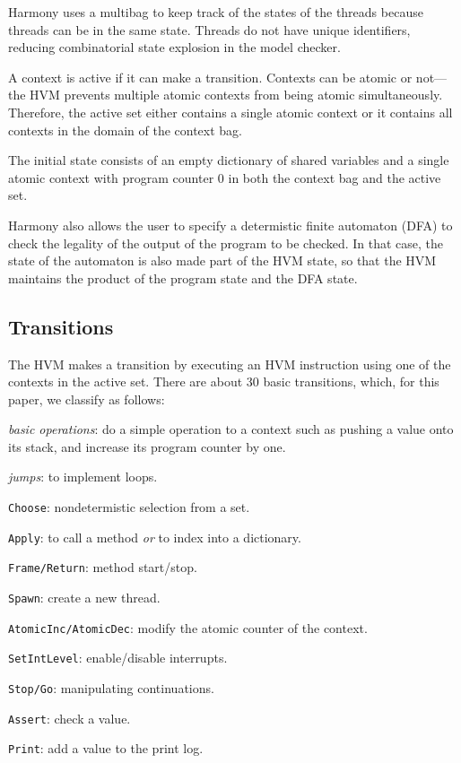 \documentclass[twocolumn]{article}
\begin{document}
Harmony uses a multibag to keep track of the states of the threads
because threads can be in the same state.
Threads do not have unique identifiers, reducing combinatorial
state explosion in the model checker.

A context is active if it can make a transition.
Contexts can be atomic or not---the HVM prevents multiple atomic
contexts from being atomic simultaneously.  Therefore, the active set
either contains a single atomic context or it contains all contexts
in the domain of the context bag.

The initial state consists of an empty dictionary of shared variables and
a single atomic context with program
counter 0 in both the context bag and the active set.

Harmony also allows the user to specify a determistic finite automaton
(DFA) to check the legality of the output of the program to be
checked.  In that case, the state of the automaton is also made
part of the HVM state, so that the HVM maintains the product of the
program state and the DFA state.

\subsection{Transitions}

The HVM makes a transition by executing an HVM instruction using
one of the contexts in the active set.  There are about 30 basic
transitions, which, for this paper, we classify as follows:

\begin{compactitem}
\item \emph{basic operations}: do a simple operation to a context
such as pushing a value onto its stack, and increase its program
counter by one.
\item \emph{jumps}: to implement loops.
\item \texttt{Choose}: nondetermistic selection from a set.
\item \texttt{Apply}: to call a method \emph{or} to index into a dictionary.
\item \texttt{Frame/Return}: method start/stop.
\item \texttt{Spawn}: create a new thread.
\item \texttt{AtomicInc/AtomicDec}: modify the atomic counter of the context.
\item \texttt{SetIntLevel}: enable/disable interrupts.
\item \texttt{Stop/Go}: manipulating continuations.
\item \texttt{Assert}: check a value.
\item \texttt{Print}: add a value to the print log.
\end{compactitem}
\end{document}
